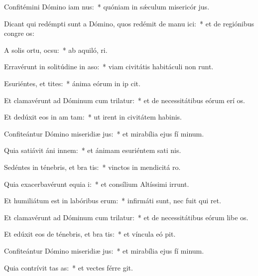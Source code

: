 \item Confitémini Dómino iam nus:~* quóniam in sǽculum misericór jus.
\item Dicant qui redémpti sunt a Dómino, quos redémit de manu ici:~* et de regiónibus congre os:
\item A solis ortu,  ocsu:~* ab aquiló,  ri.
\item Erravérunt in solitúdine in aso:~* viam civitátis habitáculi non runt.
\item Esuriéntes, et tites:~* ánima eórum in ip cit.
\item Et clamavérunt ad Dóminum cum trilatur:~* et de necessitátibus eórum erí os.
\item Et dedúxit eos in am tam:~* ut irent in civitátem habinis.
\item Confiteántur Dómino miseridiæ jus:~* et mirabília ejus fí minum.
\item Quia satiávit áni innem:~* et ánimam esuriéntem sati nis.
\item Sedéntes in ténebris, et bra tis:~* vinctos in mendicitá  ro.
\item Quia exacerbavérunt equia i:~* et consílium Altíssimi irrunt.
\item Et humiliátum est in labóribus  erum:~* infirmáti sunt, nec fuit qui ret.
\item Et clamavérunt ad Dóminum cum trilatur:~* et de necessitátibus eórum libe os.
\item Et edúxit eos de ténebris, et bra tis:~* et víncula eó pit.
\item Confiteántur Dómino miseridiæ jus:~* et mirabília ejus fí minum.
\item Quia contrívit tas as:~* et vectes férre git.
